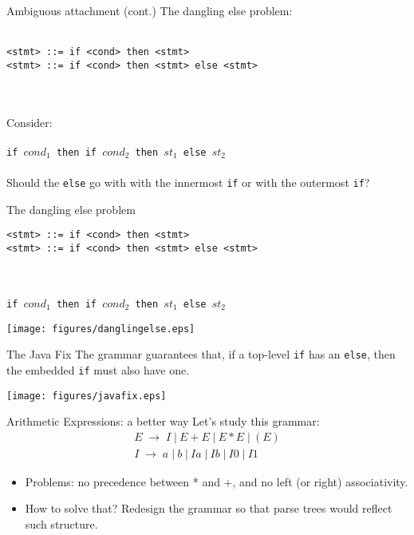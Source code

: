 \documentclass{prosper}%
\newcommand{\ra}{\mbox{$\;\rightarrow\;$}}
\newcommand{\vb}{\mbox{$\;|\:$}}
\begin{document}
\begin{slide}{Ambiguous attachment (cont.)}
The dangling else problem:
\\\ \\
\begin{verbatim}
<stmt> ::= if <cond> then <stmt>
<stmt> ::= if <cond> then <stmt> else <stmt>
\end{verbatim}
\ \\\ \\
Consider:
\\\ \\
{\tt if $cond_1$ then if $cond_2$ then $st_1$ else $st_2$}
\\\ \\
Should the {\tt else} go with with the innermost {\tt if} or with the outermost {\tt if}?

\end{slide}

\begin{slide}{The dangling else problem}
\begin{verbatim}
<stmt> ::= if <cond> then <stmt>
<stmt> ::= if <cond> then <stmt> else <stmt>
\end{verbatim}
\ \\\ \\
{\tt if $cond_1$ then if $cond_2$ then $st_1$ else $st_2$}

\begin{center}
\texttt{[image: figures/danglingelse.eps]}
\end{center}
\end{slide}

\begin{slide}{The Java Fix}
The grammar guarantees that, if a top-level {\tt if} has an {\tt else}, then the embedded {\tt if} must also have one.
\begin{center}
\texttt{[image: figures/javafix.eps]}
\end{center}
\end{slide}

\begin{slide}{Arithmetic Expressions: a better way}
Let's study this grammar:
\[
\begin{array}{l}
E \ra I \vb E + E \vb E * E \vb (E)\\
I \ra a \vb b \vb Ia \vb Ib \vb I0 \vb I1
\end{array}\]
\begin{itemize}
\item Problems: no precedence between * and +, and no left (or right) associativity.
\item How to solve that? Redesign the grammar so that parse trees would reflect such structure.
\end{itemize}
\end{slide}
\end{document}
